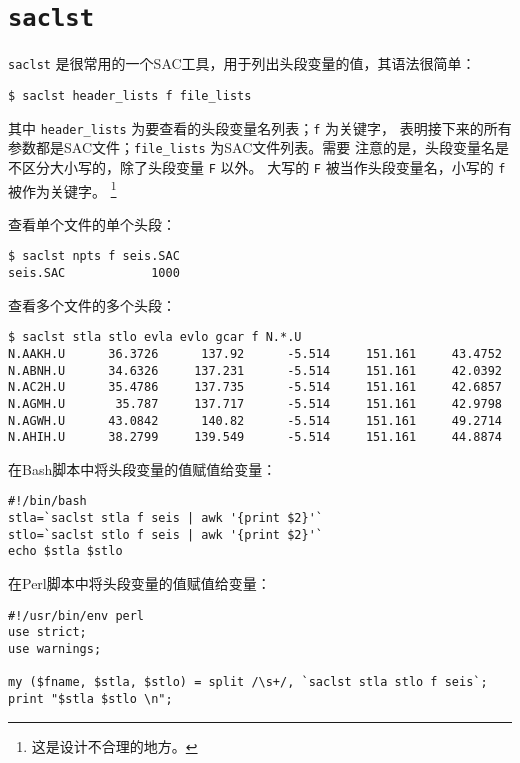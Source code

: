 \section{\texttt{saclst}}
\label{sec:saclst}

\texttt{saclst} 是很常用的一个SAC工具，用于列出头段变量的值，其语法很简单：
\begin{verbatim}
$ saclst header_lists f file_lists
\end{verbatim}
其中 \verb|header_lists| 为要查看的头段变量名列表；\texttt{f} 为关键字，
表明接下来的所有参数都是SAC文件；\verb|file_lists| 为SAC文件列表。需要
注意的是，头段变量名是不区分大小写的，除了头段变量 \texttt{F} 以外。
大写的 \texttt{F} 被当作头段变量名，小写的 \texttt{f} 被作为关键字。
\footnote{这是设计不合理的地方。}

查看单个文件的单个头段：
\begin{verbatim}
$ saclst npts f seis.SAC
seis.SAC            1000
\end{verbatim}

查看多个文件的多个头段：
\begin{verbatim}
$ saclst stla stlo evla evlo gcar f N.*.U
N.AAKH.U      36.3726      137.92      -5.514     151.161     43.4752
N.ABNH.U      34.6326     137.231      -5.514     151.161     42.0392
N.AC2H.U      35.4786     137.735      -5.514     151.161     42.6857
N.AGMH.U       35.787     137.717      -5.514     151.161     42.9798
N.AGWH.U      43.0842      140.82      -5.514     151.161     49.2714
N.AHIH.U      38.2799     139.549      -5.514     151.161     44.8874
\end{verbatim}

在Bash脚本中将头段变量的值赋值给变量：
\begin{verbatim}
#!/bin/bash
stla=`saclst stla f seis | awk '{print $2}'`
stlo=`saclst stlo f seis | awk '{print $2}'`
echo $stla $stlo
\end{verbatim}

在Perl脚本中将头段变量的值赋值给变量：
\begin{verbatim}
#!/usr/bin/env perl
use strict;
use warnings;

my ($fname, $stla, $stlo) = split /\s+/, `saclst stla stlo f seis`;
print "$stla $stlo \n";
\end{verbatim}
